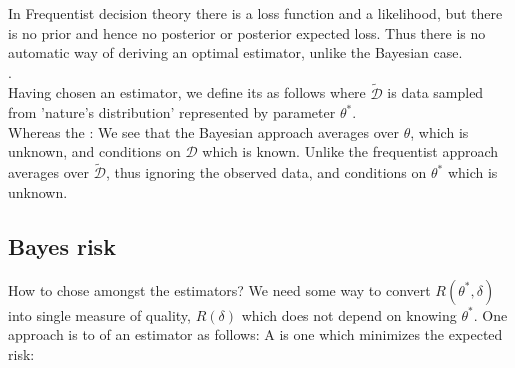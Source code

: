 In Frequentist decision theory there is a loss function and a likelihood, but there
is no prior and hence no posterior or posterior expected loss. Thus there is no 
automatic way of deriving an optimal estimator, unlike the Bayesian case.\\
.\\
Having chosen an estimator, we define its  as follows
where $\tilde{\mathcal{D}}$ is data sampled from 'nature's distribution' represented by
parameter $\theta^{*}$.\\
Whereas the : 
We see that the Bayesian approach averages over $\theta$, which is unknown, and conditions
on $\mathcal{D}$ which is known. Unlike the frequentist approach averages over $\tilde{
\mathcal{D}}$, thus ignoring the observed data, and conditions on $\theta^{*}$ which is 
unknown.

\subsection{Bayes risk}
How to chose amongst the estimators? 
We need some way to convert $R(\theta^{*}, \delta)$ into single measure of quality, $R(
\delta)$ which does not depend on knowing $\theta^{*}$. One approach is to   of an estimator as follows:
A  is one which minimizes the
expected risk: 

